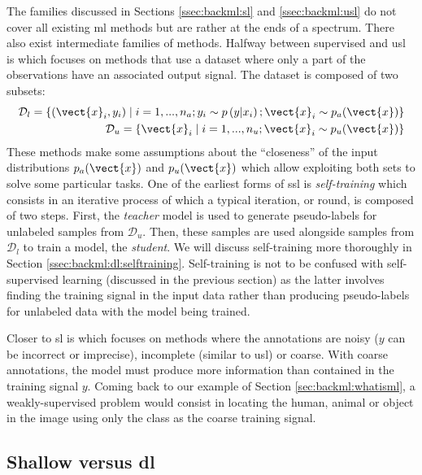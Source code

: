 The families discussed in Sections \ref{ssec:backml:sl} and \ref{ssec:backml:usl}
do not cover all existing \acrlong{ml} methods but are rather at the ends of a
spectrum. There also exist intermediate families of methods. Halfway between
supervised and \acrlong{usl} is  which focuses on methods that
use a dataset where only a part of the observations have an associated output
signal. The dataset is composed of two subsets:
\begin{eqnarray}
\mathcal{D}_l = \left\{(\vect{x}_i, y_i) \mid i = 1,...,n_a; y_i \sim p\left(y | x_i\right); \vect{x}_i \sim p_a(\vect{x})\right\} \\
\mathcal{D}_u = \left\{\vect{x}_i \mid i = 1,...,n_u; \vect{x}_i \sim p_u(\vect{x})\right\}
\end{eqnarray}
These methods make some assumptions about the ``closeness'' of the input distributions
$p_a(\vect{x})$ and $p_u(\vect{x})$ \cite{chapelle2006semi} which allow
exploiting both sets to solve some particular tasks. One of the earliest forms of
\acrlong{ssl} is \textit{self-training} \cite{scudder1965probability, yarowsky1995unsupervised} which consists in an 
iterative process of which a typical iteration, or round, is composed of two steps. First, the \textit{teacher} model is 
used to generate pseudo-labels for unlabeled samples from $\mathcal{D}_u$. Then, these samples are used alongside samples 
from $\mathcal{D}_l$ to train a model, the \textit{student}. We will discuss self-training more thoroughly in 
Section \ref{ssec:backml:dl:selftraining}. Self-training is not to be confused with self-supervised learning (discussed in 
the previous section) as the latter involves finding the training signal in the input data rather than producing 
pseudo-labels for unlabeled data with the model being trained. 


Closer to \acrlong{sl} is  which focuses on methods where the
annotations are noisy (\eg $y$ can be incorrect or imprecise), incomplete (similar
to \acrlong{usl}) or coarse. With coarse annotations, the model must produce more
information than contained in the training signal $y$. Coming back to our example
of Section \ref{sec:backml:whatisml}, a weakly-supervised problem would consist
in locating the human, animal or object in the image using only the class as the
coarse training signal.

\subsection{Shallow versus \acrlong{dl}}
\label{ssec:backml:shallowdeep}

